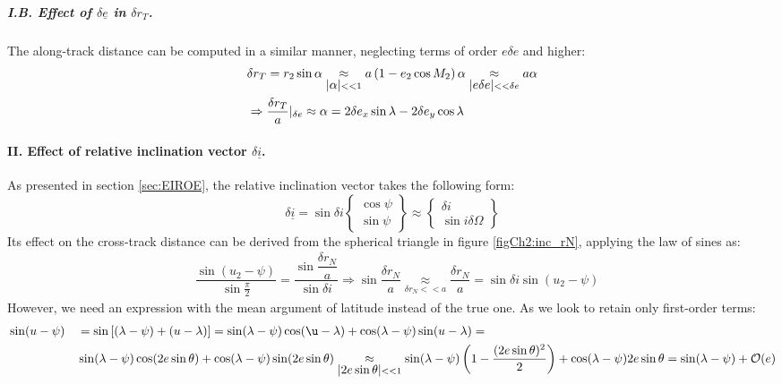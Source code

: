 			\subparagraph{\textcolor{GMVred}{I.B.} Effect of $\delta \underline{e}$ in $\delta r_T$. \\}
			\indent The along-track distance can be computed in a similar manner, neglecting terms of order $e\delta e$ and higher:
			\begin{align}
			&\nonumber \delta r_T = r_2 \sin\alpha \underset{\mbox{$\left\lvert \alpha \right\rvert$} << 1}{\approx} a \left(1 - e_2 \cos M_2\right) \alpha \underset{\mbox{$\left\lvert e\delta e \right\rvert$} << \delta e}{\approx} a\alpha \\
			& \label{eqCh2:r_T_ecc}\Rightarrow \dfrac{\delta r_T}{a}\rvert_{\delta e} \approx \alpha =  2 \delta e_x \sin\lambda - 2 \delta e_y \cos\lambda
			\end{align}
			\paragraph{\textcolor{GMVred}{II.} Effect of relative inclination vector $\delta \underline{i}$. \\}
			\indent As presented in section \ref{sec:EIROE}, the relative inclination vector takes the following form:
			\[
			\delta \underline{i} = \sin\delta i\left\{
			\begin{array}{c}
			\cos\psi\\
			\sin\psi
			\end{array}
			\right\}
			\approx \left\{
			\begin{array}{c}
			\delta i \\
			\sin i \delta \Omega
			\end{array}
			\right\}
			\]
			\indent Its effect on the cross-track distance can be derived from the spherical triangle in figure \ref{figCh2:inc_rN}, applying the law of sines as:
			\begin{align}
			&\label{eqCh2:r_N_1} \dfrac{\sin \left(u_2 - \psi\right)}{\sin\frac{\pi}{2}} = \dfrac{\sin\dfrac{\delta r_N}{a}}{\sin \delta i} \Rightarrow \sin \dfrac{\delta r_N}{a} \underset{\delta r_N << a}{\approx} \dfrac{\delta r_N}{a} = \sin \delta i \sin\left(u_2 - \psi\right)
			\end{align}
			\indent However, we need an expression with the mean argument of latitude instead of the true one. As we look to retain only first-order terms:
			\begin{align}
			&\nonumber \sin(u -  \psi) 	&&= \sin \left[ (\lambda - \psi) + (u - \lambda)\right] = \sin (\lambda - \psi) \cos (\u - \lambda) + \cos(\lambda-\psi)\sin (u -  \lambda) =\\
			&\label{eqCh2:Lambda_u} 							&&  \sin (\lambda - \psi) \cos(2e\sin\theta) + \cos(\lambda-\psi)\sin (2e\sin \theta) \underset{\abs{2e\sin\theta} <<1}{\approx}\sin (\lambda - \psi) \left(1 - \dfrac{(2e\sin\theta)^{2}}{2}\right) +  \cos(\lambda-\psi) 2e\sin\theta = \sin (\lambda - \psi) + \mathcal{O}(e)
			\end{align}
